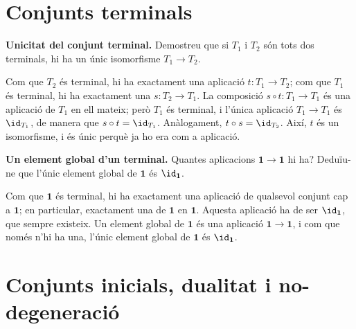 \section{Conjunts terminals}\label{prac:terminals}

\begin{exercici}
\textbf{Unicitat del conjunt terminal.} Demostreu que si \(T_1\) i \(T_2\) són tots dos terminals, hi ha un únic isomorfisme \(T_1\to T_2\).
\end{exercici}
\begin{solucio}
Com que \(T_2\) és terminal, hi ha exactament una aplicació \(t\colon T_1\to T_2\); com que \(T_1\) és terminal, hi ha exactament una \(s\colon T_2\to T_1\). La composició \(s\circ t\colon T_1\to T_1\) és una aplicació de \(T_1\) en ell mateix; però \(T_1\) és terminal, i l'única aplicació \(T_1\to T_1\) és \(\id_{T_1}\), de manera que \(s\circ t=\id_{T_1}\). Anàlogament, \(t\circ s=\id_{T_2}\). Així, \(t\) és un isomorfisme, i és únic perquè ja ho era com a aplicació.
\end{solucio}

\begin{exercici}
\textbf{Un element global d'un terminal.} Quantes aplicacions \(\mathbf1\to\mathbf1\) hi ha? Deduïu-ne que l'únic element global de \(\mathbf1\) és \(\id_{\mathbf1}\).
\end{exercici}
\begin{solucio}
Com que \(\mathbf1\) és terminal, hi ha exactament una aplicació de qualsevol conjunt cap a \(\mathbf1\); en particular, exactament una de \(\mathbf1\) en \(\mathbf1\). Aquesta aplicació ha de ser \(\id_{\mathbf1}\), que sempre existeix. Un element global de \(\mathbf1\) és una aplicació \(\mathbf1\to\mathbf1\), i com que només n'hi ha una, l'únic element global de \(\mathbf1\) és \(\id_{\mathbf1}\).
\end{solucio}

\section{Conjunts inicials, dualitat i no-degeneració}\label{prac:inicials}

